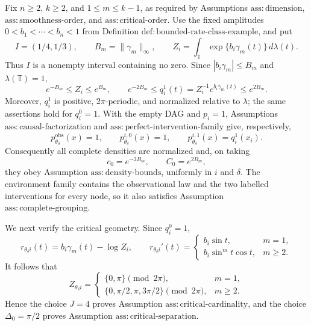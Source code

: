 Fix \(n\geq 2\), \(k\geq 2\), and \(1\leq m\leq k-1\), as required by Assumptions \(\mathrm{ass:dimension}\), \(\mathrm{ass:smoothness\text{-}order}\), and \(\mathrm{ass:critical\text{-}order}\).  Use the fixed amplitudes \(0<b_1<\cdots<b_n<1\) from Definition \(\mathrm{def:bounded\text{-}rate\text{-}class\text{-}example}\), and put
\[
 I=(1/4,1/3),\qquad B_m=\lVert\gamma_m\rVert_\infty,
 \qquad Z_i=\int_{\mathbb T}\exp\{b_i\gamma_m(t)\}\,d\lambda(t).
\]
Thus \(I\) is a nonempty interval containing no zero.  Since \(|b_i\gamma_m|\leq B_m\) and \(\lambda(\mathbb T)=1\),
\[
 e^{-B_m}\leq Z_i\leq e^{B_m},
 \qquad e^{-2B_m}\leq q_i^1(t)=Z_i^{-1}e^{b_i\gamma_m(t)}\leq e^{2B_m}.
\]
Moreover, \(q_i^1\) is positive, \(2\pi\)-periodic, and normalized relative to \(\lambda\); the same assertions hold for \(q_i^0=1\).  With the empty DAG and \(p_i=1\), Assumptions \(\mathrm{ass:causal\text{-}factorization}\) and \(\mathrm{ass:perfect\text{-}intervention\text{-}family}\) give, respectively,
\[
 p_{\theta_\delta}^{\mathrm{obs}}(x)=1,
 \qquad
 p_{\theta_\delta}^{i,0}(x)=1,
 \qquad
 p_{\theta_\delta}^{i,1}(x)=q_i^1(x_i).
\]
Consequently all complete densities are normalized and, on taking
\[
 c_0=e^{-2B_m},\qquad C_0=e^{2B_m},
\]
they obey Assumption \(\mathrm{ass:density\text{-}bounds}\), uniformly in \(i\) and \(\delta\).  The environment family contains the observational law and the two labelled interventions for every node, so it also satisfies Assumption \(\mathrm{ass:complete\text{-}grouping}\).

We next verify the critical geometry.  Since \(q_i^0=1\),
\[
 r_{\theta_\delta i}(t)=b_i\gamma_m(t)-\log Z_i,
 \qquad
 r_{\theta_\delta i}'(t)=
 \begin{cases}
 b_i\sin t,&m=1,\\
 b_i\sin^m t\cos t,&m\geq2.
 \end{cases}
\]
It follows that
\[
 Z_{\theta_\delta i}=
 \begin{cases}
 \{0,\pi\}\pmod {2\pi},&m=1,\\
 \{0,\pi/2,\pi,3\pi/2\}\pmod {2\pi},&m\geq2.
 \end{cases}
\]
Hence the choice \(J=4\) proves Assumption \(\mathrm{ass:critical\text{-}cardinality}\), and the choice \(\Delta_0=\pi/2\) proves Assumption \(\mathrm{ass:critical\text{-}separation}\).

